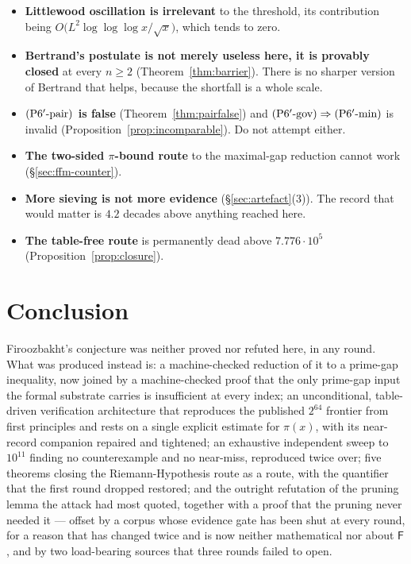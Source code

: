 \documentclass[11pt,a4paper]{article}
\theoremstyle{plain}
\theoremstyle{definition}
\theoremstyle{remark}
\newcommand{\Fb}{\mathsf{F}}
\newcommand{\Ppair}{\textup{(P6$'$-pair)}}
\newcommand{\Pgov}{\textup{(P6$'$-gov)}}
\newcommand{\Pmin}{\textup{(P6$'$-min)}}
\begin{document}
\begin{itemize}
\item \textbf{Littlewood oscillation is irrelevant} to the threshold, its contribution
  being $O\bigl(L^2\log\log\log x/\sqrt{x}\bigr)$, which tends to zero.
\item \textbf{Bertrand's postulate is not merely useless here, it is provably closed} at every
  $n \ge 2$ (Theorem~\ref{thm:barrier}). There is no sharper version of Bertrand that helps,
  because the shortfall is a whole scale.
\item \textbf{$\Ppair$ is false} (Theorem~\ref{thm:pairfalse}) and $\Pgov \Rightarrow \Pmin$ is
  invalid (Proposition~\ref{prop:incomparable}). Do not attempt either.
\item \textbf{The two-sided $\pi$-bound route} to the maximal-gap reduction cannot work
  (\S\ref{sec:ffm-counter}).
\item \textbf{More sieving is not more evidence} (\S\ref{sec:artefact}(3)). The record that
  would matter is $4.2$ decades above anything reached here.
\item \textbf{The table-free route} is permanently dead above $7.776\cdot10^5$
  (Proposition~\ref{prop:closure}).
\end{itemize}

\section{Conclusion}
\label{sec:conclusion}

Firoozbakht's conjecture was neither proved nor refuted here, in any round. What was
produced instead is: a machine-checked reduction of it to a prime-gap inequality, now joined by
a machine-checked proof that the only prime-gap input the formal substrate carries is
insufficient at every index; an unconditional, table-driven verification architecture that
reproduces the published $2^{64}$ frontier from first principles and rests on a single explicit
estimate for $\pi(x)$, with its near-record companion repaired and tightened; an exhaustive
independent sweep to $10^{11}$ finding no counterexample and no near-miss, reproduced twice
over; five theorems closing the Riemann-Hypothesis route as a route, with the quantifier that
the first round dropped restored; and the outright refutation of the pruning lemma the attack
had most quoted, together with a proof that the pruning never needed it --- offset by a corpus
whose evidence gate has been shut at every round, for a reason that has changed twice and is
now neither mathematical nor about $\Fb$, and by two load-bearing sources that three rounds
failed to open.
\end{document}

